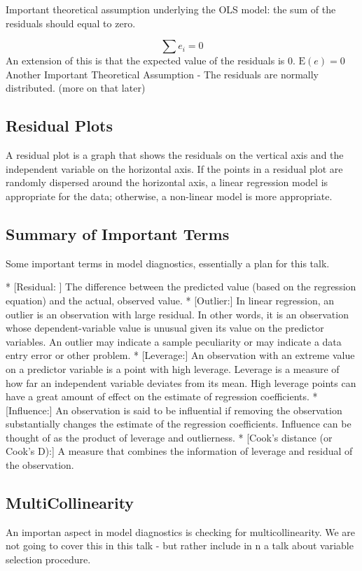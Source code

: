 Important theoretical assumption underlying the OLS model: the sum of the residuals should equal to zero. 

{
\Large
\[\sum e_i = 0\]
}
An extension of this is that the expected value of the residuals is 0. 
$\mathrm{E}(e) = 0$
Another Important Theoretical Assumption - The residuals are normally distributed. (more on that later)


\subsection{Residual Plots}
A residual plot is a graph that shows the residuals on the vertical axis and the independent variable on the horizontal axis. If the points in a residual plot are randomly dispersed around the horizontal axis, a linear regression model is appropriate for the data; otherwise, a non-linear model is more appropriate.

\newpage
\subsection*{Summary of Important Terms}
Some important terms in model diagnostics, essentially a plan for this talk.

*  [Residual: ] The difference between the predicted value (based on the regression equation) and the actual, observed value.
*  [Outlier:]  In linear regression, an outlier is an observation with large residual.  In other words, it is an observation whose dependent-variable value is unusual given its value on the predictor variables.  An outlier may indicate a sample peculiarity or may indicate a data entry error or other problem. 
*  [Leverage:]  An observation with an extreme value on a predictor variable is a point with high leverage.  Leverage is a measure of how far an independent variable deviates from its mean.  High leverage points can have a great amount of effect on the estimate of regression coefficients. 
*  [Influence:]  An observation is said to be influential if removing the observation substantially changes the estimate of the regression coefficients.  Influence can be thought of as the product of leverage and outlierness.  
*  [Cook's distance (or Cook's D):] A measure that combines the information of leverage and residual of the observation.  


\subsection*{MultiCollinearity}

An importan aspect in model diagnostics is checking for multicollinearity. We are not going to cover this in this talk - but rather include in n a talk about variable selection procedure.
\newpage


